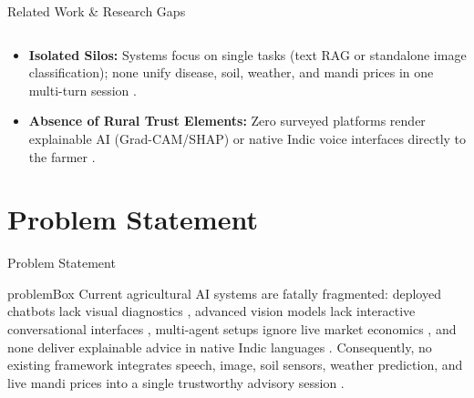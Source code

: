 \documentclass[aspectratio=169, 10pt]{beamer}
\begin{document}
\begin{frame}{Related Work \& Research Gaps}
{\begin{tabular}{llcccccccc}
            \bottomrule
        \end{tabular}
            }
    \vspace{0.25cm}
    \begin{itemize}\small\setlength{\itemsep}{3pt}
        \item \textbf{Isolated Silos:} Systems focus on single tasks (text RAG or standalone image classification); none unify disease, soil, weather, and mandi prices in one multi-turn session \cite{agridoctor2025,agrichain2025}.
        \item \textbf{Absence of Rural Trust Elements:} Zero surveyed platforms render explainable AI (Grad-CAM/SHAP) or native Indic voice interfaces directly to the farmer \cite{gradcam2017,shap2017,indicAsr2025}.
    \end{itemize}
\end{frame}

\section{Problem Statement}
\begin{frame}{Problem Statement}
    \begin{beamercolorbox}[wd=\textwidth, rounded=true, shadow=false, sep=0.35cm]{problemBox}
        \small
        Current agricultural AI systems are fatally fragmented: deployed chatbots lack visual diagnostics \cite{farmerchat2024}, advanced vision models lack interactive conversational interfaces \cite{llmiCdp2025,deeplearning2025}, multi-agent setups ignore live market economics \cite{agroaskai2024,enam2023}, and none deliver explainable advice in native Indic languages \cite{xaiCrop2024,indicAsr2025}. Consequently, no existing framework integrates speech, image, soil sensors, weather prediction, and live mandi prices into a single trustworthy advisory session \cite{mirage2025}.
    \end{beamercolorbox}
    \vspace{0.3cm}
\end{frame}

\end{document}
